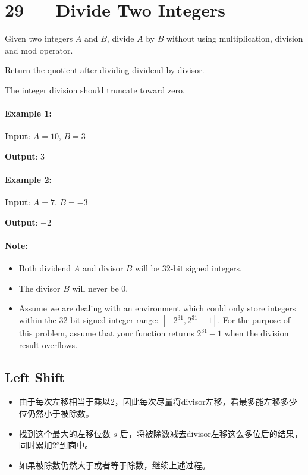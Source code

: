 \section{29 --- Divide Two Integers}
Given two integers $A$ and $B$, divide $A$ by $B$ without using multiplication, division and mod operator.

Return the quotient after dividing dividend by divisor.

The integer division should truncate toward zero.

\paragraph{Example 1:}

\begin{flushleft}
\textbf{Input}: $A = 10$, $B = 3$

\textbf{Output}: 3
\end{flushleft}

\paragraph{Example 2:}

\begin{flushleft}
\textbf{Input}: $A = 7$, $B = -3$

\textbf{Output}: $-2$
\end{flushleft}

\paragraph{Note:}

\begin{itemize}
\item Both dividend $A$ and divisor $B$ will be 32-bit signed integers.
\item The divisor $B$ will never be 0.
\item Assume we are dealing with an environment which could only store integers within the 32-bit signed integer range: $[−2^{31},  2^{31} − 1]$. For the purpose of this problem, assume that your function returns $2^{31} − 1$ when the division result overflows.
\end{itemize}

\subsection{Left Shift}
\begin{itemize}
\item 由于每次左移相当于乘以2，因此每次尽量将divisor左移，看最多能左移多少位仍然小于被除数。
\item 找到这个最大的左移位数 $s$ 后，将被除数减去divisor左移这么多位后的结果，同时累加$2^s$到商中。
\item 如果被除数仍然大于或者等于除数，继续上述过程。
\end{itemize}

